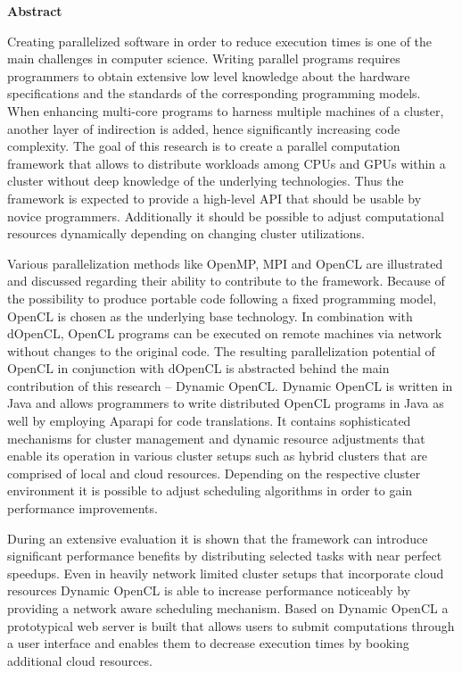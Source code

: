 \begin{center}\textsf{\textbf{Abstract}}\end{center}

\noindent Creating parallelized software in order to reduce execution times is one of the main challenges in computer science. Writing parallel programs requires programmers to obtain extensive low level knowledge about the hardware specifications and the standards of the corresponding programming models. When enhancing multi-core programs to harness multiple machines of a cluster, another layer of indirection is added, hence significantly increasing code complexity. The goal of this research is to create a parallel computation framework that allows to distribute workloads among CPUs and GPUs within a cluster without deep knowledge of the underlying technologies. Thus the framework is expected to provide a high-level API that should be usable by novice programmers. Additionally it should be possible to adjust computational resources dynamically depending on changing cluster utilizations.

Various parallelization methods like OpenMP, MPI and OpenCL are illustrated and discussed regarding their ability to contribute to the framework. Because of the possibility to produce portable code following a fixed programming model, OpenCL is chosen as the underlying base technology. In combination with dOpenCL, OpenCL programs can be executed on remote machines via network without changes to the original code. The resulting parallelization potential of OpenCL in conjunction with dOpenCL is abstracted behind the main contribution of this research -- Dynamic OpenCL. Dynamic OpenCL is written in Java and allows programmers to write distributed OpenCL programs in Java as well by employing Aparapi for code translations. It contains sophisticated mechanisms for cluster management and dynamic resource adjustments that enable its operation in various cluster setups such as hybrid clusters that are comprised of local and cloud resources. Depending on the respective cluster environment it is possible to adjust scheduling algorithms in order to gain performance improvements.

During an extensive evaluation it is shown that the framework can introduce significant performance benefits by distributing selected tasks with near perfect speedups. Even in heavily network limited cluster setups that incorporate cloud resources Dynamic OpenCL is able to increase performance noticeably by providing a network aware scheduling mechanism. Based on Dynamic OpenCL a prototypical web server is built that allows users to submit computations through a user interface and enables them to decrease execution times by booking additional cloud resources.

